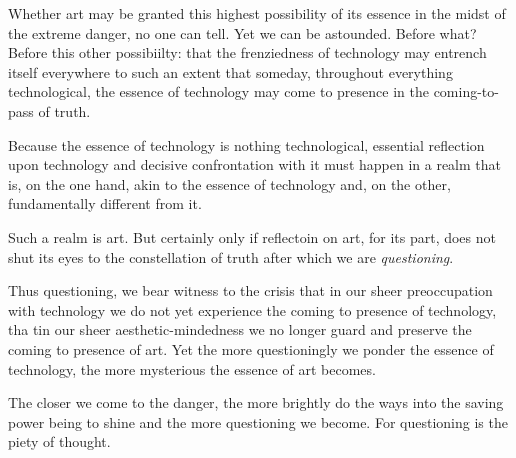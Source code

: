 Whether art may be granted this highest possibility of its essence in the midst of the extreme danger, no one can tell. Yet we can be astounded. Before what? Before this other possibiilty: that the frenziedness of technology may entrench itself everywhere to such an extent that someday, throughout everything technological, the essence of technology may come to presence in the coming-to-pass of truth.

Because the essence of technology is nothing technological, essential reflection upon technology and decisive confrontation with it must happen in a realm that is, on the one hand, akin to the essence of technology and, on the other, fundamentally different from it.

Such a realm is art.  But certainly only if reflectoin on art, for its part, does not shut its eyes to the constellation of truth after which we are \textit{questioning}.


Thus questioning, we bear witness to the crisis that in our sheer preoccupation with technology we do not yet experience the coming to presence of technology, tha tin our sheer aesthetic-mindedness we no longer guard and preserve the coming to presence of art. Yet the more questioningly we ponder the essence of technology, the more mysterious the essence of art becomes.

The closer we come to the danger, the more brightly do the ways into the saving power being to shine and the more questioning we become. For questioning is the piety of thought.

